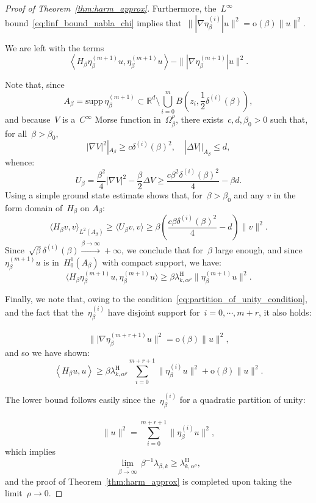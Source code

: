 \documentclass[10pt]{article}
\newcommand{\R}{\mathbb{R}}
\newcommand{\1}{\mathbbm 1}
\newcommand{\supp}{\mathrm{supp}}
\newcommand{\shift}{\rho} %
\newcommand{\deltai}{\delta^{(i)}}
\renewcommand{\o}{\mathrm{o}}
\begin{document}
\begin{proof}[Proof of Theorem~\ref{thm:harm_approx}]
        Furthermore, the~$L^\infty$ bound~\eqref{eq:linf_bound_nabla_chi} implies that~$\||\nabla\eta_\beta^{(i)}|u\|^2 = \o(\beta)\|u\|^2$.

        We are left with the terms
        \[\left\langle H_\beta \eta_\beta^{(m+1)}u,\eta_\beta^{(m+1)}u\right\rangle - \||\nabla \eta_\beta^{(m+1)}|u\|^2.\]

        Note that, since
       ~$$ A_\beta = \supp\,\eta_\beta^{(m+1)} \subset \R^d\setminus \bigcup_{i=0}^m B\left(z_i,\frac12\deltai(\beta)\right),$$
        and because~$V$ is a~$C^\infty$ Morse function in~$ \Omega_\beta^\shift$, there exists~$c,d,\beta_0>0$ such that, for all~$\beta>\beta_0$,
        \[|\nabla V|^2 |_{A_\beta} \geq c\deltai(\beta)^2,\quad |\Delta V| |_{A_\beta} \leq d,\]
        whence:
        \[U_\beta=\frac{\beta^2}4|\nabla V|^2 -\frac\beta 2 \Delta V \geq  \frac{c\beta^2 \deltai(\beta)^2}{4}-\beta d.\]
        Using a simple ground state estimate shows that, for~$\beta>\beta_0$ and any $v$ in the form domain of~$H_\beta$ on $A_\beta$:
        \[\langle H_\beta v,v\rangle_{L^2(A_\beta)} \geq \langle U_\beta v,v\rangle \geq \beta\left(\frac{c\beta\deltai(\beta)^2}{4}-d\right)\|v\|^2.\]
        Since~$\sqrt\beta\deltai(\beta)\overset{\beta\to\infty}{\longrightarrow} +\infty$, we conclude that for~$\beta$ large enough, and since~$\eta_\beta^{(m+1)}u$ is in~$H_0^1(A_\beta)$ with compact support, we have:
        \[\langle H_\beta \eta_\beta^{(m+1)}u,\eta_\beta^{(m+1)}u\rangle \geq \beta\lambda_{k,\alpha^\shift}^{\mathrm{H}}\|\eta_\beta^{(m+1)}u\|^2.\]

        Finally, we note that, owing to the condition~\eqref{eq:partition_of_unity_condition}, and the fact that the~$\eta_\beta^{(i)}$ have disjoint support for~$i=0,\dotsm,m+r$, it also holds:
       ~$$\||\nabla \eta_\beta^{(m+r+1)}u\|^2 = \o(\beta)\|u\|^2,$$
        and so we have shown:
        \begin{equation}
            \left\langle H_\beta u,u \right\rangle \geq \beta\lambda_{k,\alpha^\shift}^{\mathrm H} \sum_{i=0}^{m+r+1}\|\eta_\beta^{(i)}u\|^2 + \mathrm o(\beta)\|u\|^2.
        \end{equation}

        The lower bound follows easily since the~$\eta_\beta^{(i)}$ for a quadratic partition of unity:
       ~$$\|u\|^2 = \sum_{i=0}^{m+r+1} \|\eta_\beta^{(i)}u\|^2,$$
       which implies
       \[\underset{\beta\to\infty}{\underline\lim}\,\beta^{-1}\lambda_{\beta,k}\geq \lambda_{k,\alpha^\shift}^{\mathrm H},\]
        and the proof of Theorem~\ref{thm:harm_approx} is completed upon taking the limit~$\shift\to 0$.


\end{proof}
\end{document}
